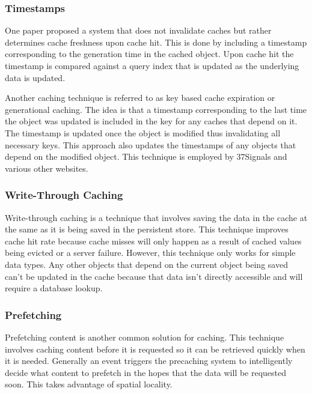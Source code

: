 \documentclass[12pt]{article}
\begin{document}
\subsubsection{Timestamps}
One paper proposed a system that does not invalidate caches but rather determines cache freshness upon cache hit.\cite{cacheInvalidationWebSearch}
This is done by including a timestamp corresponding to the generation time in the cached object.
Upon cache hit the timestamp is compared against a query index that is updated as the underlying data is updated.

Another caching technique is referred to as key based cache expiration\cite{keyBasedCacheExpiration} or generational caching\cite{generationalCaching}.
The idea is that a timestamp corresponding to the last time the object was updated is included in the key for any caches that depend on it.
The timestamp is updated once the object is modified thus invalidating all necessary keys.
This approach also updates the timestamps of any objects that depend on the modified object.
This technique is employed by 37Signals and various other websites.\cite{keyBasedCacheExpiration}

\subsubsection{Write-Through Caching}
Write-through caching is a technique that involves saving the data in the cache at the same as it is being saved in the persistent store.\cite{writeThroughCaching}
This technique improves cache hit rate because cache misses will only happen as a result of cached values being evicted or a server failure.
However, this technique only works for simple data types.
Any other objects that depend on the current object being saved can't be updated in the cache because that data isn't directly accessible and will require a database lookup.

\subsubsection{Prefetching}
Prefetching content is another common solution for caching.
This technique involves caching content before it is requested so it can be retrieved quickly when it is needed.
Generally an event triggers the precaching system to intelligently decide what content to prefetch in the hopes that the data will be requested soon.
This takes advantage of spatial locality.
\end{document}
